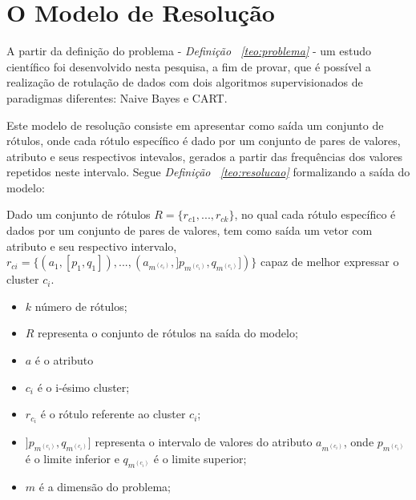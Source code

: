 
\section{O Modelo de Resolução}\label{cap:ferramentas:sec:modeloresolucao}

A partir da definição do problema - \textit{Definição ~\ref{teo:problema}} - um estudo científico foi desenvolvido nesta pesquisa, a fim de provar, que é possível a realização de rotulação de dados com dois algoritmos supervisionados de paradigmas diferentes: Naive Bayes e CART.


Este modelo de resolução consiste em apresentar como saída um conjunto de rótulos, onde cada rótulo específico é dado por um conjunto de pares de valores, atributo e seus respectivos intevalos, gerados a partir das frequências dos valores repetidos neste intervalo. Segue \textit{Definição ~\ref{teo:resolucao}} formalizando a saída do modelo:
    \begin{teorema}
    Dado um conjunto de rótulos ${ R=\{ r_{c1},...,r_{ck} \} }$, no qual cada rótulo específico é dados por um conjunto de pares de valores, tem como saída um vetor com atributo e seu respectivo intervalo, ${ r_{ci}=\{ (a_1,[p_1,q_1]),...,(a_{m^{(c_i)}}, ]p_{m^{(c_i)}},q_{m^{(c_i)}}]) \} }$ capaz de melhor expressar o cluster ${c_i}$.
        \footnotemark 
        \begin{itemize}[noitemsep]
            \item ${k}$ número de rótulos;
            \item ${R}$ representa o conjunto de rótulos na saída do modelo;
            \item ${a}$ é o atributo
            \item ${c_i}$ é o i-ésimo cluster;
            \item ${r_{c_i}}$ é o rótulo referente ao cluster ${c_i}$;
            \item ${]p_{m^{(c_i)}},q_{m^{(c_i)}}]}$ representa o intervalo de valores do atributo ${a_{m^{(c_i)}} }$, onde ${ p_{m^{(c_i)}} }$  é o limite inferior e ${ q_{m^{(c_i)}} }$ é o limite superior;
            \item ${m}$ é a dimensão do problema;
        \end{itemize}
    \label{teo:resolucao}
    \end{teorema}

